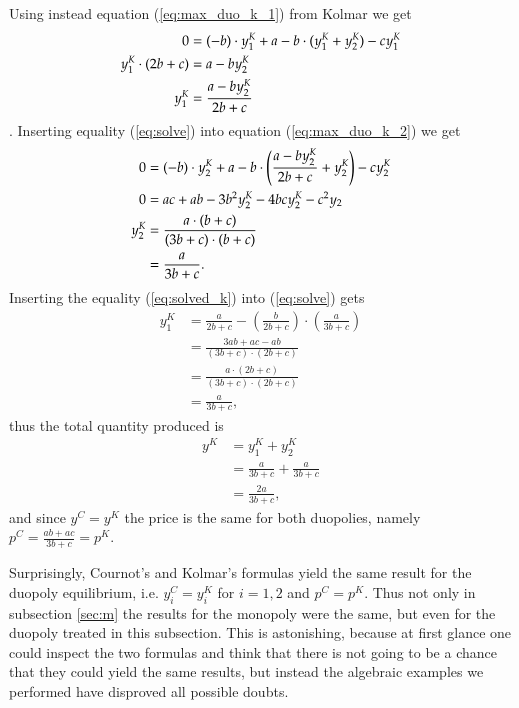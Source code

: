 \documentclass[12pt]{article}
\numberwithin{equation}{subsection}
\begin{document}
Using instead equation (\ref{eq:max_duo_k_1}) from Kolmar \citeyear{Kolmar_2022} we get \begin{align}
\label{eq:solve}
0&= (-b) \cdot y^K_1 + a - b \cdot (y^K_1 + y^K_2) -cy^K_1 \notag \\
y^K_1 \cdot (2b + c) &= a - by^K_2 \notag \\
y^K_1 & = \frac{a - by^K_2}{2b + c}
\end{align}.
Inserting equality (\ref{eq:solve}) into equation (\ref{eq:max_duo_k_2}) we get \begin{align}
\label{eq:solved_k}
0 &= (-b) \cdot y^K_2 + a - b \cdot \left(\frac{a - by^K_2}{2b + c} + y^K_2\right) - cy^K_2 \notag \\
0 &= ac + ab - 3b^2y^K_2 - 4bcy^K_2 - c^2y_2 \notag \\
y^K_2 & = \frac{a \cdot (b + c)}{(3b + c) \cdot (b+c)}\notag \\
&= \frac{a}{3b + c}.
\end{align}
Inserting the equality (\ref{eq:solved_k}) into (\ref{eq:solve}) gets \begin{align*}
y^K_1 & = \frac{a}{2b+c} - \left(\frac{b}{2b + c}\right) \cdot \left(\frac{a}{3b + c}\right)\\
& = \frac{3ab + ac - ab}{(3b + c) \cdot (2b + c)}\\
& = \frac{a \cdot (2b + c)}{(3b + c) \cdot (2b + c)} \\
& = \frac{a}{3b + c},
\end{align*}
thus the total quantity produced is \begin{align*}
y^K & = y^K_1 + y^K_2 \\
& = \frac{a}{3b + c} + \frac{a}{3b + c}\\
& = \frac{2a}{3b + c},
\end{align*}and since $y^C = y^K$ the price is the same for both duopolies, namely $p^C = \frac{ab + ac}{3b + c} = p^K$.

Surprisingly, Cournot's and Kolmar's formulas yield the same result for the duopoly equilibrium, i.e. $y^C_i = y^K_i$ for $i = 1,2$ and $p^C = p^K$. Thus not only in subsection \ref{sec:m} the results for the monopoly were the same, but even for the duopoly treated in this subsection. This is astonishing, because at first glance one could inspect the two formulas and think that there is not going to be a chance that they could yield the same results, but instead the algebraic examples we performed have disproved all possible doubts.
\end{document}
